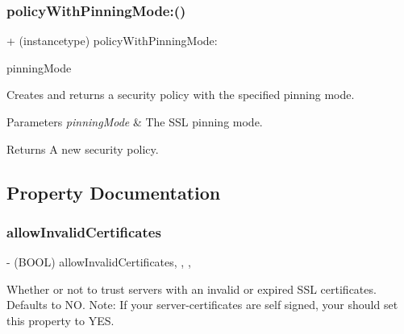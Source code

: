 \subsubsection{\texorpdfstring{policy\+With\+Pinning\+Mode\+:()}{policyWithPinningMode:()}}
{\footnotesize\ttfamily + (instancetype) policy\+With\+Pinning\+Mode\+: \begin{DoxyParamCaption}\item[{(M\+Q\+T\+T\+S\+S\+L\+Pinning\+Mode)}]{pinning\+Mode }\end{DoxyParamCaption}}

Creates and returns a security policy with the specified pinning mode.


\begin{DoxyParams}{Parameters}
{\em pinning\+Mode} & The S\+SL pinning mode.\\
\hline
\end{DoxyParams}
\begin{DoxyReturn}{Returns}
A new security policy. 
\end{DoxyReturn}


\subsection{Property Documentation}
\mbox{\label{interface_m_q_t_t_s_s_l_security_policy_a42fe688d550833a1f903be92b72cf384}} 
\subsubsection{\texorpdfstring{allow\+Invalid\+Certificates}{allowInvalidCertificates}}
{\footnotesize\ttfamily -\/ (B\+O\+OL) allow\+Invalid\+Certificates\hspace{0.3cm}{\ttfamily [read]}, {\ttfamily [write]}, {\ttfamily [nonatomic]}, {\ttfamily [assign]}}

Whether or not to trust servers with an invalid or expired S\+SL certificates. Defaults to {\ttfamily NO}. Note\+: If your server-\/certificates are self signed, your should set this property to \textquotesingle{}Y\+ES\textquotesingle{}. \mbox{\label{interface_m_q_t_t_s_s_l_security_policy_a83bc83437d250926466effce0a949371}} 
